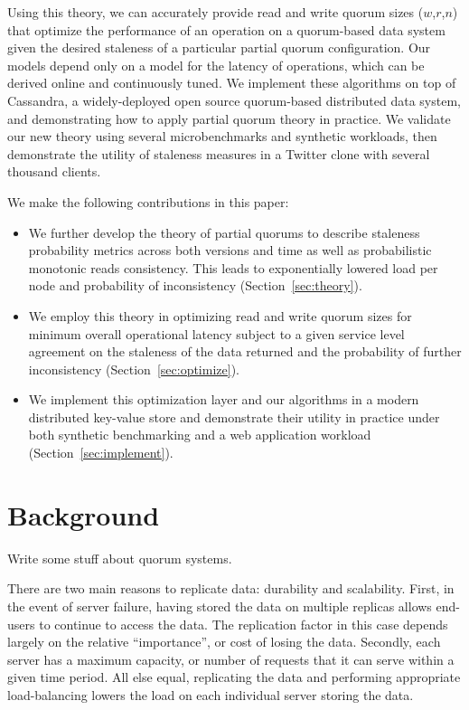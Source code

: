 \documentclass{vldb}
\begin{document}
Using this theory, we can accurately provide read and write quorum
sizes ($w$,$r$,$n$) that optimize the performance of an operation on a
quorum-based data system given the desired staleness of a particular
partial quorum configuration.  Our models depend only on a model for
the latency of operations, which can be derived online and
continuously tuned.  We implement these algorithms on top of
Cassandra, a widely-deployed open source quorum-based distributed
data system, and demonstrating how to apply partial quorum theory in
practice.  We validate our new theory using several microbenchmarks
and synthetic workloads, then demonstrate the utility of staleness
measures in a Twitter clone with several thousand clients.

We make the following contributions in this paper:

\begin{itemize}

\item We further develop the theory of partial quorums to describe
  staleness probability metrics across both versions and time as well
  as probabilistic monotonic reads consistency.  This leads to
  exponentially lowered load per node and probability of
  inconsistency (Section~\ref{sec:theory}).

\item We employ this theory in optimizing read and write quorum sizes
  for minimum overall operational latency subject to a given
  service level agreement on the staleness of the data returned and
  the probability of further inconsistency (Section~\ref{sec:optimize}).

\item We implement this optimization layer and our algorithms in a
  modern distributed key-value store and demonstrate their utility in
  practice under both synthetic benchmarking and a web application
  workload (Section~\ref{sec:implement}).

\end{itemize}

\section{Background}

Write some stuff about quorum systems.


There are two main reasons to replicate data: durability and
scalability.  First, in the event of server failure, having stored the
data on multiple replicas allows end-users to continue to access the
data.  The replication factor in this case depends largely on the
relative ``importance'', or cost of losing the data.  Secondly, each
server has a maximum capacity, or number of requests that it can serve within a
given time period.  All else equal, replicating the data and
performing appropriate load-balancing lowers the load on each
individual server storing the data.
\end{document}
